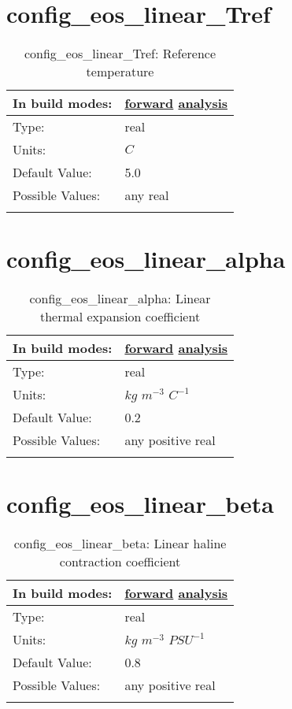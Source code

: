 \section[config\_eos\_linear\_Tref]{config\_eos\_linear\_Tref}
\label{sec:nm_sec_config_eos_linear_Tref}
\begin{center}
\begin{longtable}{| p{2.0in} || p{4.0in} |}
    \hline
    In build modes: & \hyperref[subsec:forward_nm_tab_eos_linear]{forward} \hyperref[subsec:analysis_nm_tab_eos_linear]{analysis} \\
    \hline
    Type: & real \\
    \hline
    Units: & $C$ \\
    \hline
    Default Value: & 5.0 \\
    \hline
    Possible Values: & any real \\
    \hline
    \caption{config\_eos\_linear\_Tref: Reference temperature}
\end{longtable}
\end{center}
\section[config\_eos\_linear\_alpha]{config\_eos\_linear\_alpha}
\label{sec:nm_sec_config_eos_linear_alpha}
\begin{center}
\begin{longtable}{| p{2.0in} || p{4.0in} |}
    \hline
    In build modes: & \hyperref[subsec:forward_nm_tab_eos_linear]{forward} \hyperref[subsec:analysis_nm_tab_eos_linear]{analysis} \\
    \hline
    Type: & real \\
    \hline
    Units: & $kg$ $m^{-3}$ $C^{-1}$ \\
    \hline
    Default Value: & 0.2 \\
    \hline
    Possible Values: & any positive real \\
    \hline
    \caption{config\_eos\_linear\_alpha: Linear thermal expansion coefficient}
\end{longtable}
\end{center}
\section[config\_eos\_linear\_beta]{config\_eos\_linear\_beta}
\label{sec:nm_sec_config_eos_linear_beta}
\begin{center}
\begin{longtable}{| p{2.0in} || p{4.0in} |}
    \hline
    In build modes: & \hyperref[subsec:forward_nm_tab_eos_linear]{forward} \hyperref[subsec:analysis_nm_tab_eos_linear]{analysis} \\
    \hline
    Type: & real \\
    \hline
    Units: & $kg$ $m^{-3}$ $PSU^{-1}$ \\
    \hline
    Default Value: & 0.8 \\
    \hline
    Possible Values: & any positive real \\
    \hline
    \caption{config\_eos\_linear\_beta: Linear haline contraction coefficient}
\end{longtable}
\end{center}
